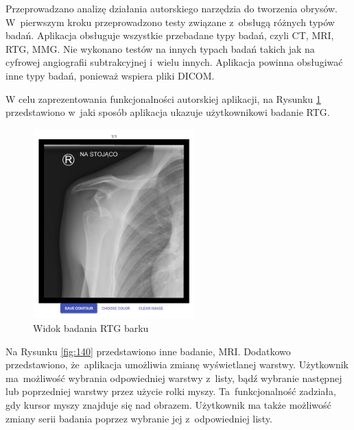 \documentclass[a4paper,11pt,twoside,openright]{report}
\theoremstyle{definition}
\begin{document}
Przeprowadzano analizę działania autorskiego narzędzia do tworzenia obrysów.
W~pierwszym kroku przeprowadzono testy związane z~obsługą różnych typów badań.
Aplikacja obsługuje wszystkie przebadane typy badań, czyli CT, MRI, RTG, MMG.
Nie wykonano testów na innych typach badań takich jak na cyfrowej angiografii subtrakcyjnej
i~wielu innych. Aplikacja powinna obsługiwać inne typy badań, ponieważ wspiera pliki DICOM.

W celu zaprezentowania funkcjonalności autorskiej aplikacji, na Rysunku \ref{fig:113}
przedstawiono w~jaki sposób aplikacja ukazuje
użytkownikowi badanie RTG.

\begin{figure}[h!]
	\center
	\includegraphics[width=0.55\textwidth]{113}
	\caption{Widok badania RTG barku}
    	\label{fig:113}
\end{figure}

Na Rysunku \ref{fig:140} przedstawiono inne badanie, MRI. Dodatkowo przedstawiono,
że~aplikacja umożliwia zmianę wyświetlanej warstwy. Użytkownik ma~możliwość wybrania
odpowiedniej warstwy z~listy, bądź wybranie następnej lub poprzedniej warstwy przez użycie
rolki myszy. Ta~funkcjonalność zadziała, gdy kursor myszy znajduje się nad obrazem.
Użytkownik ma także możliwość zmiany serii badania poprzez wybranie jej z~odpowiedniej listy.

\bigskip
\end{document}

